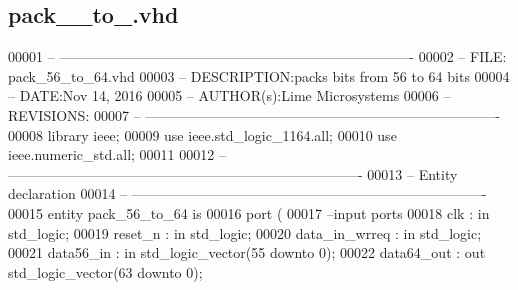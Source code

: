 \subsection{pack\+\_\+\_\+to\+\_.\+vhd}
\label{rx__path__top_2bit__pack_2synth_2pack__56__to__64_8vhd_source}

\begin{DoxyCode}
00001 \textcolor{keyword}{-- ----------------------------------------------------------------------------}
00002 \textcolor{keyword}{-- FILE: pack\_56\_to\_64.vhd}
00003 \textcolor{keyword}{-- DESCRIPTION:packs bits from 56 to 64 bits}
00004 \textcolor{keyword}{-- DATE:Nov 14, 2016}
00005 \textcolor{keyword}{-- AUTHOR(s):Lime Microsystems}
00006 \textcolor{keyword}{-- REVISIONS:}
00007 \textcolor{keyword}{-- ----------------------------------------------------------------------------}
00008 \textcolor{vhdlkeyword}{library }\textcolor{keywordflow}{ieee};
00009 \textcolor{vhdlkeyword}{use }ieee.std\_logic\_1164.\textcolor{keywordflow}{all};
00010 \textcolor{vhdlkeyword}{use }ieee.numeric\_std.\textcolor{keywordflow}{all};
00011 
00012 \textcolor{keyword}{-- ----------------------------------------------------------------------------}
00013 \textcolor{keyword}{-- Entity declaration}
00014 \textcolor{keyword}{-- ----------------------------------------------------------------------------}
00015 \textcolor{keywordflow}{entity }pack_56_to_64 \textcolor{keywordflow}{is}
00016    \textcolor{keywordflow}{port} \textcolor{vhdlchar}{(}
00017 \textcolor{keyword}{   --input ports }
00018       \textcolor{vhdlchar}{clk}            \textcolor{vhdlchar}{:} \textcolor{keywordflow}{in} \textcolor{comment}{std\_logic};
00019       \textcolor{vhdlchar}{reset_n}        \textcolor{vhdlchar}{:} \textcolor{keywordflow}{in} \textcolor{comment}{std\_logic};
00020       \textcolor{vhdlchar}{data_in_wrreq}  \textcolor{vhdlchar}{:} \textcolor{keywordflow}{in} \textcolor{comment}{std\_logic};
00021       \textcolor{vhdlchar}{data56_in}      \textcolor{vhdlchar}{:} \textcolor{keywordflow}{in} \textcolor{comment}{std\_logic\_vector}\textcolor{vhdlchar}{(}\textcolor{vhdllogic}{}\textcolor{vhdllogic}{55} \textcolor{keywordflow}{downto} \textcolor{vhdllogic}{}\textcolor{vhdllogic}{0}\textcolor{vhdlchar}{)};
00022       \textcolor{vhdlchar}{data64_out}     \textcolor{vhdlchar}{:} \textcolor{keywordflow}{out} \textcolor{comment}{std\_logic\_vector}\textcolor{vhdlchar}{(}\textcolor{vhdllogic}{}\textcolor{vhdllogic}{63} \textcolor{keywordflow}{downto} \textcolor{vhdllogic}{}\textcolor{vhdllogic}{0}\textcolor{vhdlchar}{)};

\end{DoxyCode}
